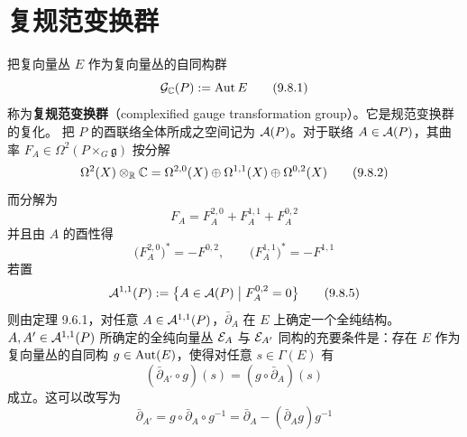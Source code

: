 
\section{复规范变换群}

把复向量丛 $E$ 作为复向量丛的自同构群
\begin{equation}
  \mathcal{G}_{\mathbb{C}}(P) := \operatorname{Aut} E
  \tag{9.8.1}
\end{equation}
称为\textbf{复规范变换群}（complexified gauge transformation group）。它是规范变换群的复化。
把 $P$ 的酉联络全体所成之空间记为 $\mathcal{A}(P)$。对于联络 $A\in\mathcal{A}(P)$，其曲率 $F_A\in\Omega^2(P\times_G\mathfrak{g})$ 按分解
\begin{equation}
  \Omega^2(X)\otimes_{\mathbb{R}}\mathbb{C}
  = \Omega^{2,0}(X)\oplus\Omega^{1,1}(X)\oplus\Omega^{0,2}(X)
  \tag{9.8.2}
\end{equation}
而分解为
\begin{equation}
  F_A = F_A^{2,0} + F_A^{1,1} + F_A^{0,2}
  \tag{9.8.3}
\end{equation}
并且由 $A$ 的酉性得
\begin{equation}
  \bigl(F_A^{2,0}\bigr)^* = -F^{0,2},\qquad
  \bigl(F_A^{1,1}\bigr)^* = -F^{1,1}
  \tag{9.8.4}
\end{equation}
若置
\begin{equation}
  \mathcal{A}^{1,1}(P) := \bigl\{A\in\mathcal{A}(P)\bigm| F_A^{0,2} = 0\bigr\}
  \tag{9.8.5}
\end{equation}
则由定理 9.6.1，对任意 $A\in\mathcal{A}^{1,1}(P)$，$\bar\partial_A$ 在 $E$ 上确定一个全纯结构。$A,A'\in\mathcal{A}^{1,1}(P)$ 所确定的全纯向量丛 $\mathcal{E}_A$ 与 $\mathcal{E}_{A'}$ 同构的充要条件是：存在 $E$ 作为复向量丛的自同构 $g\in\operatorname{Aut}(E)$，使得对任意 $s\in\Gamma(E)$ 有
\begin{equation}
  (\bar\partial_{A'}\circ g)(s) = (g\circ\bar\partial_A)(s)
  \tag{9.8.6}
\end{equation}
成立。这可以改写为
\begin{equation}
  \bar\partial_{A'} = g\circ\bar\partial_A\circ g^{-1}
  = \bar\partial_A - (\bar\partial_A g)g^{-1}
  \tag{9.8.7}
\end{equation}

